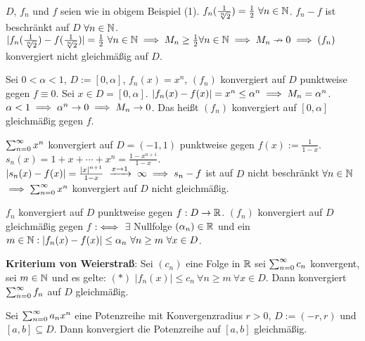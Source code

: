 \documentclass[a4paper,oneside,DIV15,BCOR12mm]{scrbook}
\begin{document}
\begin{beispiele}
\item $D$, $f_n$ und $f$ seien wie in obigem Beispiel (1). $f_n(\frac{1}{\sqrt[n]{2}}) = \frac{1}{2} \ \forall n\in\mathbb{N}$. $f_n - f$ ist beschränkt auf $D$ $\forall n\in\mathbb{N}$. $|f_n(\frac{1}{\sqrt[n]{2}}) - f(\frac{1}{\sqrt[n]{2}})| = \frac{1}{2} \ \forall n\in\mathbb{N} \implies M_n \ge \frac{1}{2} \forall n\in\mathbb{N} \implies M_n \nrightarrow 0 \implies (f_n)$ konvergiert nicht gleichmäßig auf $D$.

\item Sei $0<\alpha<1$, $D:=[0,\alpha]$, $f_n(x)=x^n$, $(f_n)$ konvergiert auf $D$ punktweise gegen $f\equiv0$. Sei $x\in D = [0,\alpha]$. $|f_n(x) - f(x)| = x^n \le \alpha^n \implies M_n = \alpha^n$. $\alpha < 1 \implies \alpha^n \to 0 \implies M_n \to 0$. Das heißt $(f_n)$ konvergiert auf $[0,\alpha]$ gleichmäßig gegen $f$.

\item $\sum_{n=0}^{\infty}{x^n}$ konvergiert auf $D= (-1,1)$ punktweise gegen $f(x) := \frac{1}{1-x}$. $s_n(x) = 1 + x+ \cdots +x^n = \frac{1-x^{n+1}}{1-x}$. $|s_n(x) - f(x)| = \frac{|x|^{n+1}}{1-x} \towegen{x\to1} \infty \folgt s_n - f$ ist auf $D$ nicht beschränkt $\forall n\in\mathbb{N}$ $\implies \sum_{n=0}^{\infty}{x^n}$ konvergiert auf $D$ nicht gleichmäßig.

\end{beispiele}

\begin{satz}[Funktionskonvergenzkriterien]
\begin{liste}
\item $f_n$ konvergiert auf $D$ punktweise gegen $f:D\to\mathbb{R}$. $(f_n)$ konvergiert auf $D$ gleichmäßig gegen $f$ $:\iff$ $\exists$ Nullfolge $(\alpha_n) \in \mathbb{R}$ und ein $m\in\MdN: |f_n(x) - f(x)| \le \alpha_n \ \forall n\ge m \ \forall x \in D$.
\item \textbf{Kriterium von Weierstraß}: Sei $(c_n)$ eine Folge in $\mathbb{R}$ sei $\sum_{n=0}^{\infty}{c_n}$ konvergent, sei $m\in\mathbb{N}$ und es gelte: $(*)$ $|f_n(x)| \le c_n \ \forall n\ge m \ \forall x\in D$. Dann konvergiert $\sum_{n=0}^{\infty}{f_n}$ auf $D$ gleichmäßig.
\item Sei $\sum_{n=0}^{\infty}{a_nx^n}$ eine Potenzreihe mit Konvergenzradius $r>0$, $D:= (-r,r)$ und $[a,b] \subseteq D$. Dann konvergiert die Potenzreihe auf $[a,b]$ gleichmäßig.
\end{liste}
\end{satz}
\end{document}
